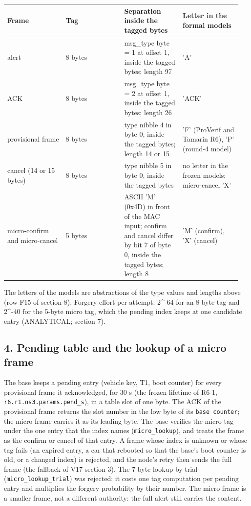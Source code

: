 {\scriptsize\raggedright
\begin{longtable}{p{0.237\linewidth}p{0.237\linewidth}p{0.237\linewidth}p{0.237\linewidth}}
\toprule
Frame & Tag & Separation inside the tagged bytes & Letter in the formal models \\
\midrule
\endhead
alert & 8 bytes & msg\_type byte = 1 at offset 1, inside the tagged bytes; length 97 & 'A' \\
ACK & 8 bytes & msg\_type byte = 2 at offset 1, inside the tagged bytes; length 26 & 'ACK' \\
provisional frame & 8 bytes & type nibble 4 in byte 0, inside the tagged bytes; length 14 or 15 & 'F' (ProVerif and Tamarin R6), 'P' (round-4 model) \\
cancel (14 or 15 bytes) & 8 bytes & type nibble 5 in byte 0, inside the tagged bytes & no letter in the frozen models; micro-cancel 'X' \\
micro-confirm and micro-cancel & 5 bytes & ASCII 'M' (0x4D) in front of the MAC input; confirm and cancel differ by bit 7 of byte 0, inside the tagged bytes; length 8 & 'M' (confirm), 'X' (cancel) \\
\bottomrule
\end{longtable}}

The letters of the models are abstractions of the type values and lengths above (row F15 of section 8). Forgery effort per attempt: 2\textasciicircum{}-64 for an 8-byte tag and 2\textasciicircum{}-40 for the 5-byte micro tag, which the pending index keeps at one candidate entry (ANALYTICAL; section 7).

\subsection*{4. Pending table and the lookup of a micro frame}

The base keeps a pending entry (vehicle key, T1, boot counter) for every provisional frame it acknowledged, for 30 s (the frozen lifetime of R6-1, \texttt{r6.r1.ns3.params.pend\_s}), in a table slot of one byte. The ACK of the provisional frame returns the slot number in the low byte of its \texttt{base counter}; the micro frame carries it as its leading byte. The base verifies the micro tag under the one entry that the index names (\texttt{micro\_lookup}), and treats the frame as the confirm or cancel of that entry. A frame whose index is unknown or whose tag fails (an expired entry, a car that rebooted so that the base's boot counter is old, or a changed index) is rejected, and the node's retry then sends the full frame (the fallback of V17 section 3). The 7-byte lookup by trial (\texttt{micro\_lookup\_trial}) was rejected: it costs one tag computation per pending entry and multiplies the forgery probability by their number. The micro frame is a smaller frame, not a different authority: the full alert still carries the content.


